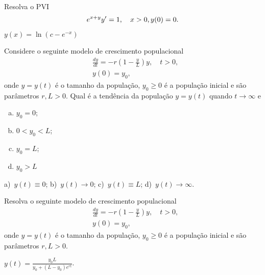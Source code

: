 \begin{exer}
  Resolva o PVI
  \begin{equation}
    e^{x+y}y' = 1,\quad x>0,\\
    y(0) = 0.
  \end{equation}
\end{exer}
\begin{resp}
  $y(x) = \ln\left(c - e^{-x}\right)$
\end{resp}

\begin{exer}
  Considere o seguinte modelo de crescimento populacional
  \begin{align*}
    &\frac{dy}{dt} = -r\left(1 - \frac{y}{L}\right)y,\quad t>0,\\
    &y(0) = y_0,
  \end{align*}
  onde $y = y(t)$ é o tamanho da população, $y_0 \geq 0$ é a população inicial e são parâmetros $r, L > 0$. Qual é a tendência da população $y = y(t)$ quando $t\to\infty$ e
  \begin{enumerate}[a)]
  \item $y_0 = 0$;
  \item $0 < y_0 < L$;
  \item $y_0 = L$;
  \item $y_0 > L$
  \end{enumerate}
\end{exer}
\begin{resp}
  a)~$y(t) \equiv 0$; b)~$y(t)\to 0$; c)~$y(t)\equiv L$; d)~$y(t)\to\infty$.
\end{resp}

\begin{exer}
  Resolva o seguinte modelo de crescimento populacional
  \begin{align*}
    &\frac{dy}{dt} = -r\left(1 - \frac{y}{L}\right)y,\quad t>0,\\
    &y(0) = y_0,
  \end{align*}
  onde $y = y(t)$ é o tamanho da população, $y_0 \geq 0$ é a população inicial e são parâmetros $r, L > 0$.
\end{exer}
\begin{resp}
  $\displaystyle y(t) = \frac{y_0L}{y_0 + (L-y_0)e^{rt}}$.
\end{resp}

